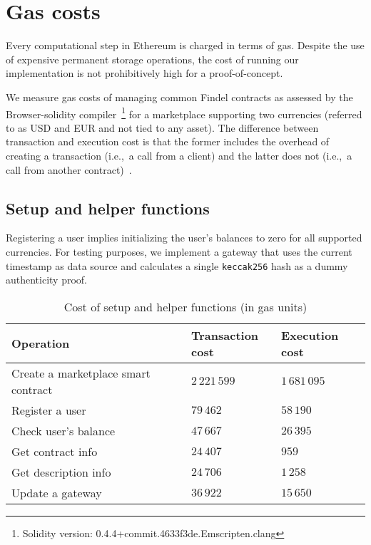 
\section{Gas costs} \label{sec:Ch10FindelTesting}

Every computational step in Ethereum is charged in terms of gas.
Despite the use of expensive permanent storage operations, the cost of running our implementation is not prohibitively high for a proof-of-concept.

We measure gas costs of managing common Findel contracts as assessed by the Browser-solidity compiler~\cite{BrowserSolidity}\footnote{Solidity version: 0.4.4+commit.4633f3de.Emscripten.clang} for a marketplace supporting two currencies (referred to as USD and EUR and not tied to any asset).
The difference between transaction and execution cost is that the former includes the overhead of creating a transaction (i.e.,~a call from a client) and the latter does not (i.e.,~a call from another contract)~\cite{Revere2016}.

\subsection{Setup and helper functions}

Registering a user implies initializing the user's balances to zero for all supported currencies.
For testing purposes, we implement a gateway that uses the current timestamp as data source and calculates a single \texttt{keccak256} hash as a dummy authenticity proof.

\begin{table}
	\centering
	\begin{tabular}{| p{0.5\linewidth} | p{0.25\linewidth} | p{0.25\linewidth} |}
		\hline
		\textbf{Operation} & \textbf{Transaction cost} & \textbf{Execution cost} \\
		\hline
		Create a marketplace smart contract & $2\,221\,599$ & $1\,681\,095$ \\
		\hline
		Register a user & $79\,462$ & $58\,190$ \\
		\hline
		Check user's balance & $47\,667$ & $26\,395$ \\
		\hline
		Get contract info & $24\,407$ & $959$ \\
		\hline
		Get description info & $24\,706$ & $1\,258$ \\
		\hline
		Update a gateway & $36\,922$ & $15\,650$ \\
		\hline
	\end{tabular}
	\caption{Cost of setup and helper functions (in gas units)}
	\label{tab:Ch10FindelCost}
\end{table}


